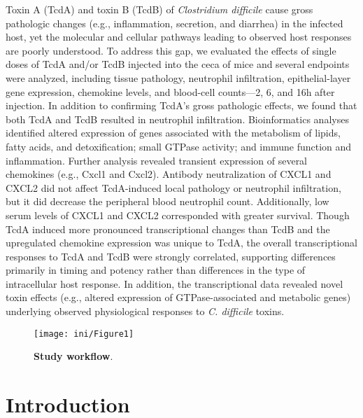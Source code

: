 Toxin A (TcdA) and toxin B (TcdB) of \textit{Clostridium difficile} cause gross 
pathologic changes (e.g., inflammation, secretion, and diarrhea) in the infected
host, yet the molecular and cellular pathways leading to observed host responses
are poorly understood. To address this gap, we evaluated the effects of single
doses of TcdA and/or TcdB injected into the ceca of mice and several endpoints
were analyzed, including tissue pathology, neutrophil infiltration, epithelial-layer 
gene expression, chemokine levels, and blood-cell counts—2, 6, and 16h after
injection. In addition to confirming TcdA's gross pathologic effects, we 
found that both TcdA and TcdB resulted in neutrophil infiltration. Bioinformatics 
analyses identified altered expression of genes associated with the metabolism 
of lipids, fatty acids, and detoxification; small GTPase activity; and immune
function and inflammation. Further analysis revealed transient expression of 
several chemokines (e.g., Cxcl1 and Cxcl2). Antibody neutralization of CXCL1
and CXCL2 did not affect TcdA-induced local pathology or neutrophil 
infiltration, but it did decrease the peripheral blood neutrophil count. 
Additionally, low serum levels of CXCL1 and CXCL2 corresponded with greater 
survival. Though TcdA induced more pronounced transcriptional changes than 
TcdB and the upregulated chemokine expression was unique to TcdA, the 
overall transcriptional responses to TcdA and TcdB were strongly correlated, 
supporting differences primarily in timing and potency rather than differences 
in the type of intracellular host response. In addition, the transcriptional 
data revealed novel toxin effects (e.g., altered expression of GTPase-associated 
and metabolic genes) underlying observed physiological responses to 
\textit{C. difficile} toxins.

\begin{figure}
  \centering
  \texttt{[image: ini/Figure1]}
  \caption[Study workflow]{
       \textbf{Study workflow}.
  }
  \label{ini:fig1}
\end{figure}


\section{Introduction}

